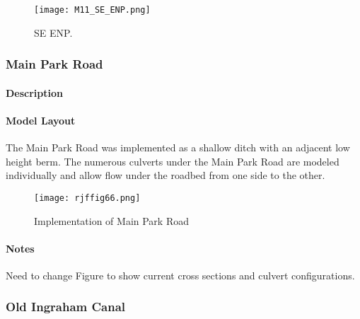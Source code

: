 \begin{figure}[!h]
  \begin{center}
  \texttt{[image: M11\_SE\_ENP.png]}
  \caption{SE ENP.}
  \label{fig:M11_SE_ENP}
  \end{center}
\end{figure}

\clearpage
\subsubsection{Main Park Road}

\paragraph{Description}

\paragraph{Model Layout}
The Main Park Road was implemented as a shallow ditch with an adjacent low height berm. The numerous culverts under the Main Park Road are modeled individually and allow flow under the roadbed from one side to the other.

\begin{figure}[!h]
  \begin{center}
  \texttt{[image: rjffig66.png]}
  \caption{Implementation of Main Park Road}
  \label{fig:rjffig66}
  \end{center}
\end{figure}

\begin{notes}
\paragraph{Notes}
Need to change Figure to show current cross sections and culvert configurations.
\end{notes}


\clearpage
\subsubsection{Old Ingraham Canal}
